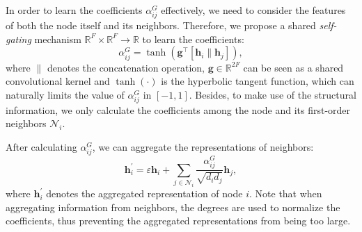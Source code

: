 \documentclass[letterpaper]{article} %
\begin{document}
In order to learn the coefficients $\alpha_{ij}^{G}$ effectively, we need to consider the features of both the node itself and its neighbors.
Therefore, we propose a shared \emph{self-gating} mechanism $\mathbb{R}^{F} \times \mathbb{R}^{F} \to \mathbb{R}$ to learn the coefficients:
\begin{equation}
\label{tanh}
	\alpha_{ij}^{G}=\tanh \left( \mathbf{g}^{\top} \left[ \mathbf{h}_{i} \parallel \mathbf{h}_{j} \right] \right),
\end{equation}
where $\parallel$ denotes the concatenation operation, $\mathbf{g} \in \mathbb{R}^{2F}$ can be seen as a shared convolutional kernel \cite{GAT} and $\tanh(\cdot)$ is the hyperbolic tangent function, which can naturally limits the value of $\alpha_{ij}^{G}$ in $[-1, 1]$. Besides, to make use of the structural information, we only calculate the coefficients among the node and its first-order neighbors $\mathcal{N}_{i}$.

After calculating $\alpha_{ij}^{G}$, we can aggregate the representations of neighbors:
\begin{equation}
\label{self-gating}
	\mathbf{h}_{i}^{'}= \varepsilon \mathbf{h}_{i} + \sum_{j \in \mathcal{N}_{i}} \frac{\alpha_{ij}^{G}}{\sqrt{d_{i}d_{j}}} \mathbf{h}_{j},
\end{equation}
where $\mathbf{h}_{i}^{'}$ denotes the aggregated representation of node $i$. Note that when aggregating information from neighbors, the degrees are used to normalize the coefficients, thus preventing the aggregated representations from being too large.
\end{document}
